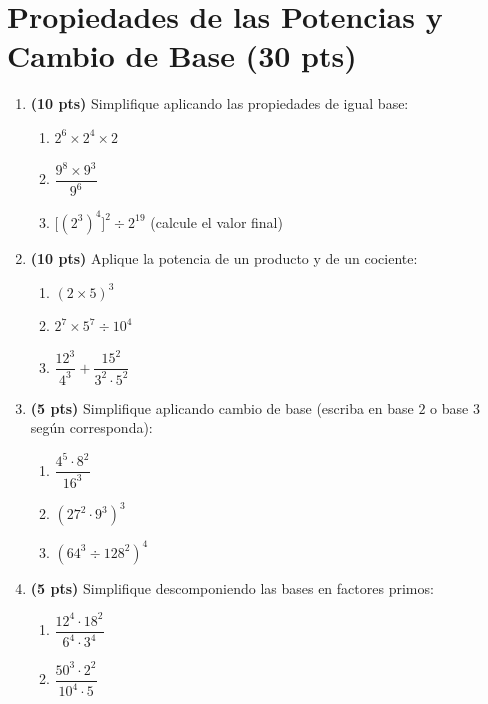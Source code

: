 \documentclass[12pt, letterpaper]{article}
\begin{document}
\section{Propiedades de las Potencias y Cambio de Base (30 pts)}

\begin{enumerate}[leftmargin=*]
  \item \textbf{(10 pts)} Simplifique aplicando las propiedades de igual base:
        \begin{enumerate}[label=\alph*)]
          \item $2^{6} \times 2^{4} \times 2$
          \item $\dfrac{9^{8} \times 9^{3}}{9^{6}}$
          \item $\big[(2^{3})^{4}\big]^{2} \div 2^{19}$ \quad (calcule el valor final)
        \end{enumerate}

  \item \textbf{(10 pts)} Aplique la potencia de un producto y de un cociente:
        \begin{enumerate}[label=\alph*)]
          \item $(2 \times 5)^{3}$
          \item $2^{7} \times 5^{7} \div 10^{4}$
          \item $\dfrac{12^{3}}{4^{3}} + \dfrac{15^{2}}{3^{2} \cdot 5^{2}}$
        \end{enumerate}

  \item \textbf{(5 pts)} Simplifique aplicando cambio de base (escriba en base $2$ o base $3$ según corresponda):
        \begin{enumerate}[label=\alph*)]
          \item $\dfrac{4^{5} \cdot 8^{2}}{16^{3}}$
          \item $(27^{2} \cdot 9^{3})^{3}$
          \item $(64^{3} \div 128^{2})^{4}$
        \end{enumerate}

  \item \textbf{(5 pts)} Simplifique descomponiendo las bases en factores primos:
        \begin{enumerate}[label=\alph*)]
          \item $\dfrac{12^{4} \cdot 18^{2}}{6^{4} \cdot 3^{4}}$
          \item $\dfrac{50^{3} \cdot 2^{2}}{10^{4} \cdot 5}$
        \end{enumerate}
\end{enumerate}
\end{document}
